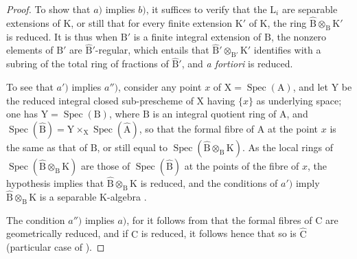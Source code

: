 \begin{proof}

To show that $a)$ implies $b)$, it suffices to verify that the $\mathrm{L}_i$ are separable extensions of $\mathrm{K}$, or still  that for every finite extension $\mathrm{K}'$ of $\mathrm{K}$, the ring $\widehat{\mathrm{B}}\otimes_\mathrm{B}\mathrm{K}'$ is reduced. It is thus when $\mathrm{B}'$ is a finite integral extension of $\mathrm{B}$, the nonzero elements of $\mathrm{B}'$ are $\widehat{\mathrm{B}}'$-regular, which entails that $\widehat{\mathrm{B}}'\otimes_{\mathrm{B}'}\mathrm{K}'$ identifies with a subring of the total ring of fractions of $\widehat{\mathrm{B}}'$, and \emph{a fortiori} is reduced.

To see that $a')$ implies $a'')$, consider any point $x$ of $\mathrm{X}=\operatorname{Spec}(\mathrm{A})$, and let $\mathrm{Y}$ be the reduced integral closed sub-prescheme of $\mathrm{X}$ having $\{x\}$ as underlying space; one has $\mathrm{Y}=\operatorname{Spec}(\mathrm{B})$, where $\mathrm{B}$ is an integral quotient ring of $\mathrm{A}$, and $\operatorname{Spec}(\widehat{\mathrm{B}})=\mathrm{Y}\times_\mathrm{X}\operatorname{Spec}(\widehat{\mathrm{A}})$, so that the formal fibre of $\mathrm{A}$ at the point $x$ is the same as that of $\mathrm{B}$, or still equal to $\operatorname{Spec}(\widehat{\mathrm{B}}\otimes_\mathrm{B}\mathrm{K})$. As the local rings of $\operatorname{Spec}(\widehat{\mathrm{B}}\otimes_\mathrm{B}\mathrm{K})$ are those of $\operatorname{Spec}(\widehat{\mathrm{B}})$ at the points of the fibre of $x$, the hypothesis implies that $\widehat{\mathrm{B}}\otimes_\mathrm{B}\mathrm{K}$ is reduced, and the conditions of $a')$ imply $\widehat{\mathrm{B}}\otimes_\mathrm{B}\mathrm{K}$ is a separable $\mathrm{K}$-algebra .

The condition $a'')$ implies $a)$, for it follows from  that the formal fibres of $\mathrm{C}$ are geometrically reduced, and if $\mathrm{C}$ is reduced, it follows hence that so is $\widehat{\mathrm{C}}$ (particular case of ).


\end{proof}
